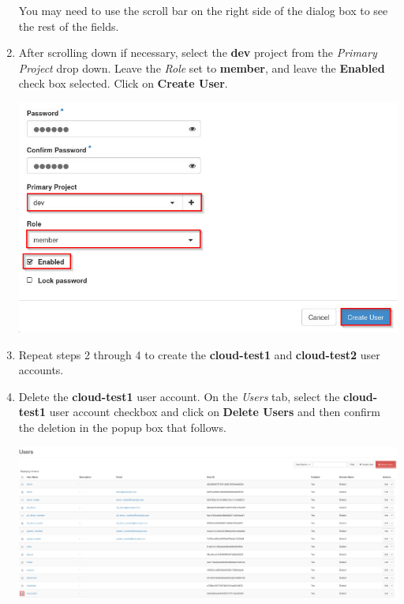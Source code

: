 \documentclass[letterpaper, 12pt]{article}
\begin{document}
\begin{enumerate}
    \begin{tipbox}
        You may need to use the scroll bar on the right side of the dialog box to see the rest of the fields.
    \end{tipbox}

    \item After scrolling down if necessary, select the \textbf{dev} project from the \textit{Primary Project} drop
    down. Leave the \textit{Role} set to \textbf{member}, and leave the \textbf{Enabled} check box selected. Click on
    \textbf{Create User}.

    \begin{center}
        \includegraphics[width=\linewidth]{images/part3/step4.png}
    \end{center}

    \item Repeat steps 2 through 4 to create the \textbf{cloud-test1} and \textbf{cloud-test2} user accounts.

    \item Delete the \textbf{cloud-test1} user account. On the \textit{Users} tab, select the \textbf{cloud-test1} user
    account checkbox and click on \textbf{Delete Users} and then confirm the deletion in the popup box that follows.

    \begin{center}
        \includegraphics[width=\linewidth]{images/part3/step6.png}
    \end{center}


\end{enumerate}
\end{document}
